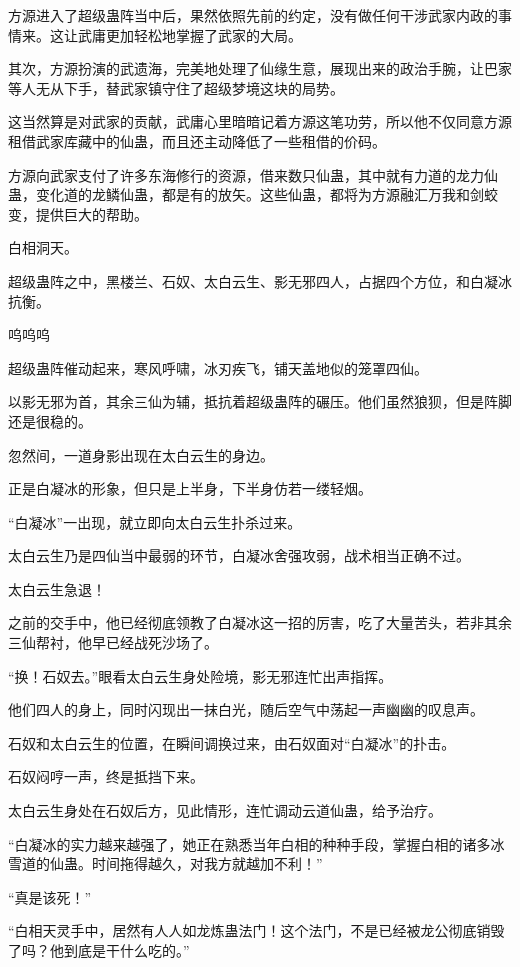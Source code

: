 \begin{this_body}
方源进入了超级蛊阵当中后，果然依照先前的约定，没有做任何干涉武家内政的事情来。这让武庸更加轻松地掌握了武家的大局。

其次，方源扮演的武遗海，完美地处理了仙缘生意，展现出来的政治手腕，让巴家等人无从下手，替武家镇守住了超级梦境这块的局势。

这当然算是对武家的贡献，武庸心里暗暗记着方源这笔功劳，所以他不仅同意方源租借武家库藏中的仙蛊，而且还主动降低了一些租借的价码。

方源向武家支付了许多东海修行的资源，借来数只仙蛊，其中就有力道的龙力仙蛊，变化道的龙鳞仙蛊，都是有的放矢。这些仙蛊，都将为方源融汇万我和剑蛟变，提供巨大的帮助。

白相洞天。

超级蛊阵之中，黑楼兰、石奴、太白云生、影无邪四人，占据四个方位，和白凝冰抗衡。

呜呜呜

超级蛊阵催动起来，寒风呼啸，冰刃疾飞，铺天盖地似的笼罩四仙。

以影无邪为首，其余三仙为辅，抵抗着超级蛊阵的碾压。他们虽然狼狈，但是阵脚还是很稳的。

忽然间，一道身影出现在太白云生的身边。

正是白凝冰的形象，但只是上半身，下半身仿若一缕轻烟。

“白凝冰”一出现，就立即向太白云生扑杀过来。

太白云生乃是四仙当中最弱的环节，白凝冰舍强攻弱，战术相当正确不过。

太白云生急退！

之前的交手中，他已经彻底领教了白凝冰这一招的厉害，吃了大量苦头，若非其余三仙帮衬，他早已经战死沙场了。

“换！石奴去。”眼看太白云生身处险境，影无邪连忙出声指挥。

他们四人的身上，同时闪现出一抹白光，随后空气中荡起一声幽幽的叹息声。

石奴和太白云生的位置，在瞬间调换过来，由石奴面对“白凝冰”的扑击。

石奴闷哼一声，终是抵挡下来。

太白云生身处在石奴后方，见此情形，连忙调动云道仙蛊，给予治疗。

“白凝冰的实力越来越强了，她正在熟悉当年白相的种种手段，掌握白相的诸多冰雪道的仙蛊。时间拖得越久，对我方就越加不利！”

“真是该死！”

“白相天灵手中，居然有人人如龙炼蛊法门！这个法门，不是已经被龙公彻底销毁了吗？他到底是干什么吃的。”


\end{this_body}
